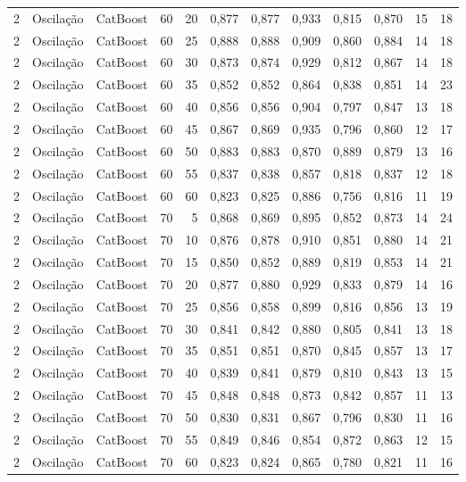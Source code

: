 \begin{longtable}{@{}rllrrrrrrrrr@{}}
2 & Oscilação & CatBoost & 60 & 20 & 0,877 & 0,877 & 0,933 & 0,815 & 0,870 & 15 & 18 \\
2 & Oscilação & CatBoost & 60 & 25 & 0,888 & 0,888 & 0,909 & 0,860 & 0,884 & 14 & 18 \\
2 & Oscilação & CatBoost & 60 & 30 & 0,873 & 0,874 & 0,929 & 0,812 & 0,867 & 14 & 18 \\
2 & Oscilação & CatBoost & 60 & 35 & 0,852 & 0,852 & 0,864 & 0,838 & 0,851 & 14 & 23 \\
2 & Oscilação & CatBoost & 60 & 40 & 0,856 & 0,856 & 0,904 & 0,797 & 0,847 & 13 & 18 \\
2 & Oscilação & CatBoost & 60 & 45 & 0,867 & 0,869 & 0,935 & 0,796 & 0,860 & 12 & 17 \\
2 & Oscilação & CatBoost & 60 & 50 & 0,883 & 0,883 & 0,870 & 0,889 & 0,879 & 13 & 16 \\
2 & Oscilação & CatBoost & 60 & 55 & 0,837 & 0,838 & 0,857 & 0,818 & 0,837 & 12 & 18 \\
2 & Oscilação & CatBoost & 60 & 60 & 0,823 & 0,825 & 0,886 & 0,756 & 0,816 & 11 & 19 \\
2 & Oscilação & CatBoost & 70 & 5 & 0,868 & 0,869 & 0,895 & 0,852 & 0,873 & 14 & 24 \\
2 & Oscilação & CatBoost & 70 & 10 & 0,876 & 0,878 & 0,910 & 0,851 & 0,880 & 14 & 21 \\
2 & Oscilação & CatBoost & 70 & 15 & 0,850 & 0,852 & 0,889 & 0,819 & 0,853 & 14 & 21 \\
2 & Oscilação & CatBoost & 70 & 20 & 0,877 & 0,880 & 0,929 & 0,833 & 0,879 & 14 & 16 \\
2 & Oscilação & CatBoost & 70 & 25 & 0,856 & 0,858 & 0,899 & 0,816 & 0,856 & 13 & 19 \\
2 & Oscilação & CatBoost & 70 & 30 & 0,841 & 0,842 & 0,880 & 0,805 & 0,841 & 13 & 18 \\
2 & Oscilação & CatBoost & 70 & 35 & 0,851 & 0,851 & 0,870 & 0,845 & 0,857 & 13 & 17 \\
2 & Oscilação & CatBoost & 70 & 40 & 0,839 & 0,841 & 0,879 & 0,810 & 0,843 & 13 & 15 \\
2 & Oscilação & CatBoost & 70 & 45 & 0,848 & 0,848 & 0,873 & 0,842 & 0,857 & 11 & 13 \\
2 & Oscilação & CatBoost & 70 & 50 & 0,830 & 0,831 & 0,867 & 0,796 & 0,830 & 11 & 16 \\
2 & Oscilação & CatBoost & 70 & 55 & 0,849 & 0,846 & 0,854 & 0,872 & 0,863 & 12 & 15 \\
2 & Oscilação & CatBoost & 70 & 60 & 0,823 & 0,824 & 0,865 & 0,780 & 0,821 & 11 & 16 \\

\end{longtable}
